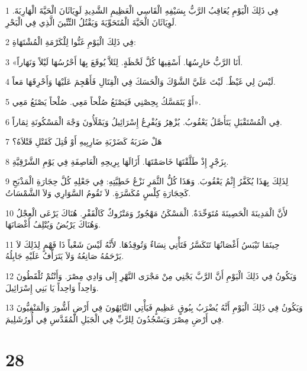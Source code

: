 \par 1 فِي ذَلِكَ الْيَوْمِ يُعَاقِبُ الرَّبُّ بِسَيْفِهِ الْقَاسِي الْعَظِيمِ الشَّدِيدِ لَوِيَاثَانَ الْحَيَّةَ الْهَارِبَةَ. لَوِيَاثَانَ الْحَيَّةَ الْمُتَحَوِّيَةَ وَيَقْتُلُ التِّنِّينَ الَّذِي فِي الْبَحْرِ.
\par 2 فِي ذَلِكَ الْيَوْمِ غَنُّوا لِلْكَرْمَةِ الْمُشْتَهَاةِ:
\par 3 «أَنَا الرَّبُّ حَارِسُهَا. أَسْقِيهَا كُلَّ لَحْظَةٍ. لِئَلاَّ يُوقَعَ بِهَا أَحْرُسُهَا لَيْلاً وَنَهَاراً.
\par 4 لَيْسَ لِي غَيْظٌ. لَيْتَ عَلَيَّ الشَّوْكَ وَالْحَسَكَ فِي الْقِتَالِ فَأَهْجِمَ عَلَيْهَا وَأَحْرِقَهَا مَعاً.
\par 5 أَوْ يَتَمَسَّكُ بِحِصْنِي فَيَصْنَعُ صُلْحاً مَعِي. صُلْحاً يَصْنَعُ مَعِي».
\par 6 فِي الْمُسْتَقْبَلِ يَتَأَصَّلُ يَعْقُوبُ. يُزْهِرُ وَيُفْرِعُ إِسْرَائِيلُ وَيَمْلَأُونَ وَجْهَ الْمَسْكُونَةِ ثِمَاراً.
\par 7 هَلْ ضَرَبَهُ كَضَرْبَةِ ضَارِبِيهِ أَوْ قُتِلَ كَقَتْلِ قَتْلاَهُ؟
\par 8 بِزَجْرٍ إِذْ طَلَّقْتَهَا خَاصَمْتَهَا. أَزَالَهَا بِرِيحِهِ الْعَاصِفَةِ فِي يَوْمِ الشَّرْقِيَّةِ.
\par 9 لِذَلِكَ بِهَذَا يُكَفَّرُ إِثْمُ يَعْقُوبَ. وَهَذَا كُلُّ الثَّمَرِ نَزْعُ خَطِيَّتِهِ: فِي جَعْلِهِ كُلَّ حِجَارَةِ الْمَذْبَحِ كَحِجَارَةِ كِلْسٍ مُكَسَّرَةٍ. لاَ تَقُومُ السَّوَارِي وَلاَ الشَّمْسَاتُ.
\par 10 لأَنَّ الْمَدِينَةَ الْحَصِينَةَ مُتَوَحِّدَةٌ. الْمَسْكَنُ مَهْجُورٌ وَمَتْرُوكٌ كَالْقَفْرِ. هُنَاكَ يَرْعَى الْعِجْلُ وَهُنَاكَ يَرْبُضُ وَيُتْلِفُ أَغْصَانَهَا.
\par 11 حِينَمَا تَيْبَسُ أَغْصَانُهَا تَتَكَسَّرُ فَتَأْتِي نِسَاءٌ وَتُوقِدُهَا. لأَنَّهُ لَيْسَ شَعْباً ذَا فَهْمٍ لِذَلِكَ لاَ يَرْحَمُهُ صَانِعُهُ وَلاَ يَتَرَأَّفُ عَلَيْهِ جَابِلُهُ.
\par 12 وَيَكُونُ فِي ذَلِكَ الْيَوْمِ أَنَّ الرَّبَّ يَجْنِي مِنْ مَجْرَى النَّهْرِ إِلَى وَادِي مِصْرَ. وَأَنْتُمْ تُلْقَطُونَ وَاحِداً وَاحِداً يَا بَنِي إِسْرَائِيلَ.
\par 13 وَيَكُونُ فِي ذَلِكَ الْيَوْمِ أَنَّهُ يُضْرَبُ بِبُوقٍ عَظِيمٍ فَيَأْتِي التَّائِهُونَ فِي أَرْضِ أَشُّورَ وَالْمَنْفِيُّونَ فِي أَرْضِ مِصْرَ وَيَسْجُدُونَ لِلرَّبِّ فِي الْجَبَلِ الْمُقَدَّسِ فِي أُورُشَلِيمَ.

\chapter{28}

